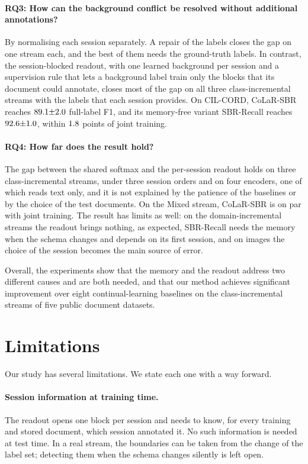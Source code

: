 \paragraph{RQ3: How can the background conflict be resolved without additional
annotations?} By normalising each session separately. A repair of the labels closes the
gap on one stream each, and the best of them needs the ground-truth labels. In contrast,
the session-blocked readout, with one learned background per session and a supervision
rule that lets a background label train only the blocks that its document could annotate,
closes most of the gap on all three class-incremental streams with the labels that each
session provides. On CIL-CORD, CoLaR-SBR reaches $89.1{\pm}2.0$ full-label F1, and its
memory-free variant SBR-Recall reaches $92.6{\pm}1.0$, within $1.8$ points of
joint training.

\paragraph{RQ4: How far does the result hold?} The gap between the shared softmax and the
per-session readout holds on three class-incremental streams, under three session orders
and on four encoders, one of which reads text only, and it is not explained by the patience of the baselines or by
the choice of the test documents. On the Mixed stream, CoLaR-SBR is on par with joint
training. The result has limits as well: on the domain-incremental streams the readout
brings nothing, as expected, SBR-Recall needs the memory when the schema changes and
depends on its first session, and on images the choice of the session becomes the main
source of error.

Overall, the experiments show that the memory and the readout address two different causes
and are both needed, and that our method achieves significant improvement over eight
continual-learning baselines on the class-incremental streams of five public document
datasets.

\section{Limitations}
\label{sec:c7-s2}

Our study has several limitations. We state each one with a way forward.

\paragraph{Session information at training time.} The readout opens one block per session
and needs to know, for every training and stored document, which session annotated it. No
such information is needed at test time. In a real stream, the boundaries can be taken
from the change of the label set; detecting them when the schema changes silently is left
open.

